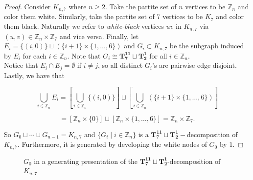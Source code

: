 \documentclass{dmgt}
\newcommand{\ZZ}{\ensuremath{\mathbb{Z}}} %
\begin{document}
\begin{proof}
    Consider $K_{n,7}$ where $n\geq 2$. Take the partite set of $n$ vertices to be $\ZZ_{n}$ and color them white. Similarly, take the partite set of $7$ vertices to be $K_{7}$ and color them black. Naturally we refer to \textit{white-black} vertices $uv$ in $K_{n,7}$ via $(u,v)\in \ZZ_{n}\times\ZZ_{7}$ and vice versa. Finally, let $E_{i}=\{(i,0)\}\sqcup (\{i+1\}\times \{1,\hdots,6\})$ and $G_{i}\subset K_{n,7}$ be the subgraph induced by $E_{i}$ for each $i\in \ZZ_{n}$. Note that $G_{i}\cong \mathbf{T_{7}^{11}}\sqcup\mathbf{T_{2}^{1}}$ for all $i\in \ZZ_{n}$.
    \\
    
    \noindent Notice that $E_{i}\cap E_{j}=\emptyset$ if $i\neq j$, so all distinct $G_{i}$'s are pairwise edge disjoint. Lastly, we have that
    
    $$\bigcup_{i\in \ZZ_{n}} E_{i}=[\bigcup_{i\in \ZZ_{n}} \{(i,0)\}]\sqcup [\bigcup_{i\in \ZZ_{n}} (\{i+1\}\times \{1,\hdots, 6\})]$$
    
    $$=[\ZZ_{n}\times \{0\}]\sqcup [\ZZ_{n}\times \{1,\hdots, 6\}]=\ZZ_{n}\times \ZZ_{7}.$$
    
    \noindent So $G_{0}\sqcup \cdots \sqcup G_{n-1}=K_{n,7}$ and $\{G_{i}\mid i\in \ZZ_{n}\}$ is a $\mathbf{T_{7}^{11}}\sqcup\mathbf{T_{2}^{1}}-$decomposition of $K_{n,7}$. Furthermore, it is generated by developing the white nodes of $G_{0}$ by $1$.
    
\end{proof}

\begin{figure}
    \centering
    
    \caption{$G_{0}$ in a generating presentation of the $\mathbf{T_{7}^{11}}\sqcup\mathbf{T_{2}^{1}}$-decomposition of $K_{n,7}$}
    \label{fig:enter-label}
\end{figure}



\end{document}
